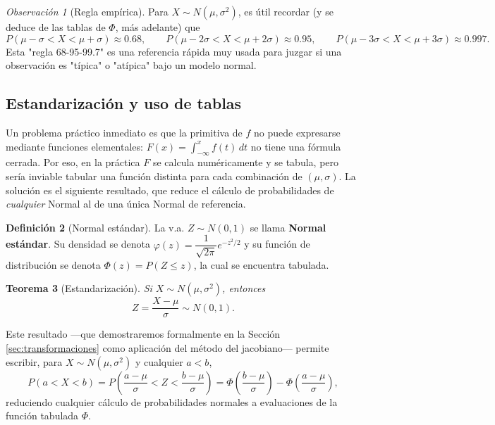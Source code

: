 \documentclass[11pt,a4paper]{article}
\theoremstyle{plain}
\newtheorem{teorema}{Teorema}[section]
\theoremstyle{definition}
\newtheorem{definicion}[teorema]{Definición}
\theoremstyle{remark}
\newtheorem{observacion}[teorema]{Observación}
\begin{document}
\begin{observacion}[Regla empírica]
Para $X\sim N(\mu,\sigma^2)$, es útil recordar (y se deduce de las tablas de $\Phi$, más adelante) que
$$P(\mu-\sigma<X<\mu+\sigma)\approx0.68,\qquad P(\mu-2\sigma<X<\mu+2\sigma)\approx0.95,\qquad P(\mu-3\sigma<X<\mu+3\sigma)\approx0.997.$$
Esta "regla 68-95-99.7" es una referencia rápida muy usada para juzgar si una observación es "típica" o "atípica" bajo un modelo normal.
\end{observacion}

\subsection{Estandarización y uso de tablas}

Un problema práctico inmediato es que la primitiva de $f$ no puede expresarse mediante funciones elementales: $F(x)=\int_{-\infty}^x f(t)\,dt$ no tiene una fórmula cerrada. Por eso, en la práctica $F$ se calcula numéricamente y se tabula, pero sería inviable tabular una función distinta para cada combinación de $(\mu,\sigma)$. La solución es el siguiente resultado, que reduce el cálculo de probabilidades de \emph{cualquier} Normal al de una única Normal de referencia.

\begin{definicion}[Normal estándar]
La v.a. $Z\sim N(0,1)$ se llama \textbf{Normal estándar}. Su densidad se denota $\varphi(z)=\dfrac{1}{\sqrt{2\pi}}e^{-z^2/2}$ y su función de distribución se denota $\Phi(z)=P(Z\le z)$, la cual se encuentra tabulada.
\end{definicion}

\begin{teorema}[Estandarización]\label{thm:estandarizacion}
Si $X\sim N(\mu,\sigma^2)$, entonces
$$Z=\frac{X-\mu}{\sigma}\sim N(0,1).$$
\end{teorema}

Este resultado —que demostraremos formalmente en la Sección \ref{sec:transformaciones} como aplicación del método del jacobiano— permite escribir, para $X\sim N(\mu,\sigma^2)$ y cualquier $a<b$,
$$P(a<X<b)=P\left(\frac{a-\mu}{\sigma}<Z<\frac{b-\mu}{\sigma}\right)=\Phi\left(\frac{b-\mu}{\sigma}\right)-\Phi\left(\frac{a-\mu}{\sigma}\right),$$
reduciendo cualquier cálculo de probabilidades normales a evaluaciones de la función tabulada $\Phi$.
\end{document}
